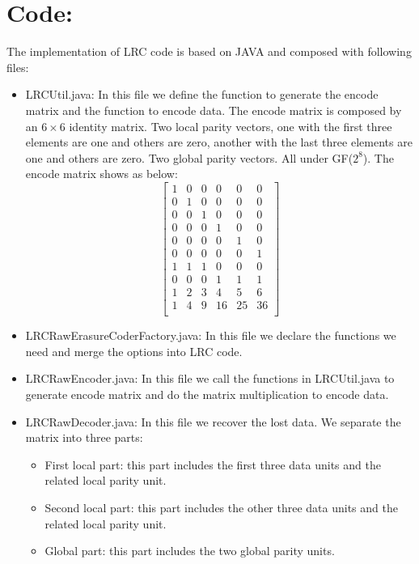 \documentclass[10pt]{article}
\begin{document}
\section{Code:}
The implementation of LRC code is based on JAVA and composed with following files:
\begin{itemize}
\item LRCUtil.java: In this file we define the function to generate the encode matrix and the function to encode data. The encode matrix is composed by an $6\times 6$ identity matrix. Two local parity vectors, one with the first three elements are one and others are zero, another with the last three elements are one and others are zero. Two global parity vectors. All under GF($2^8$). The encode matrix shows as below:
$$
  \left[
  \begin{matrix}
   1 & 0 & 0 & 0 & 0 & 0 \\
   0 & 1 & 0 & 0 & 0 & 0 \\
   0 & 0 & 1 & 0 & 0 & 0 \\
   0 & 0 & 0 & 1 & 0 & 0 \\
   0 & 0 & 0 & 0 & 1 & 0 \\
   0 & 0 & 0 & 0 & 0 & 1 \\
   1 & 1 & 1 & 0 & 0 & 0 \\
   0 & 0 & 0 & 1 & 1 & 1 \\
   1 & 2 & 3 & 4 & 5 & 6 \\
   1 & 4 & 9 & 16 & 25 & 36 \\
  \end{matrix}
  \right]
$$
\item LRCRawErasureCoderFactory.java: In this file we declare the functions we need and merge the options into LRC code.
\item LRCRawEncoder.java: In this file we call the functions in LRCUtil.java to generate encode matrix and do the matrix multiplication to encode data.
\item LRCRawDecoder.java: In this file we recover the lost data. We separate the matrix into three parts:
\begin{itemize}
\item First local part: this part includes the first three data units and the related local parity unit.
\item Second local part: this part includes the other three data units and the related local parity unit.
\item Global part: this part includes the two global parity units.
\end{itemize}

\end{itemize}
\end{document}
